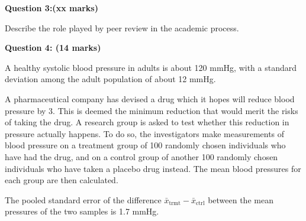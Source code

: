 \documentclass[a4paper,12pt,fleqn]{article}
\begin{document}
\vspace{1cm}

\textbf{Question 3:(xx marks)}\newline

Describe the role played by peer review in the academic process.

\vspace{1cm}

\textbf{Question 4: (14 marks)}\newline


	A healthy systolic blood pressure in adults is about 120 mmHg, with a standard deviation among the adult population of about 12 mmHg. \newline
	
	A pharmaceutical company has devised a drug which it hopes will reduce blood pressure by \SI{3}{\mmhg}. This is deemed the minimum reduction that would merit the risks of taking the drug. A research group is asked to test whether this reduction in pressure actually happens. To do so, the investigators make measurements of blood pressure on a treatment group of 100 randomly chosen individuals who have had the drug, and on a control group of another 100 randomly chosen individuals who have taken a placebo drug instead.  The mean blood pressures for each group are then calculated.\newline
	
	
	The pooled standard error of the difference  $\bar{x}_\text{trmt}-\bar{x}_\text{ctrl}$ between the mean pressures of the two samples is 1.7 mmHg.
\end{document}
